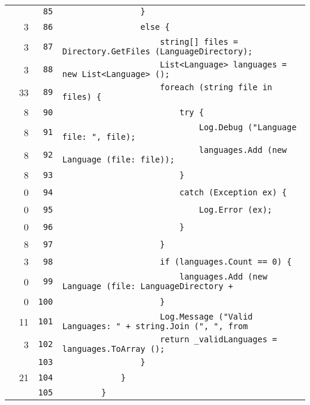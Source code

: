 \documentclass[a4paper,10pt]{article}
\begin{document}
\begin{longtable}[l]{lrrl}
\cellcolor{gray} &  & \verb~85~ & \verb~                }~\\
\cellcolor{green} & 3 & \verb~86~ & \verb~                else {~\\
\cellcolor{green} & 3 & \verb~87~ & \verb~                    string[] files = Directory.GetFiles (LanguageDirectory);~\\
\cellcolor{green} & 3 & \verb~88~ & \verb~                    List<Language> languages = new List<Language> ();~\\
\cellcolor{green} & 33 & \verb~89~ & \verb~                    foreach (string file in files) {~\\
\cellcolor{green} & 8 & \verb~90~ & \verb~                        try {~\\
\cellcolor{green} & 8 & \verb~91~ & \verb~                            Log.Debug ("Language file: ", file);~\\
\cellcolor{green} & 8 & \verb~92~ & \verb~                            languages.Add (new Language (file: file));~\\
\cellcolor{green} & 8 & \verb~93~ & \verb~                        }~\\
\cellcolor{red} & 0 & \verb~94~ & \verb~                        catch (Exception ex) {~\\
\cellcolor{red} & 0 & \verb~95~ & \verb~                            Log.Error (ex);~\\
\cellcolor{red} & 0 & \verb~96~ & \verb~                        }~\\
\cellcolor{green} & 8 & \verb~97~ & \verb~                    }~\\
\cellcolor{green} & 3 & \verb~98~ & \verb~                    if (languages.Count == 0) {~\\
\cellcolor{red} & 0 & \verb~99~ & \verb~                        languages.Add (new Language (file: LanguageDirectory +~\\
\cellcolor{red} & 0 & \verb~100~ & \verb~                    }~\\
\cellcolor{green} & 11 & \verb~101~ & \verb~                    Log.Message ("Valid Languages: " + string.Join (", ", from~\\
\cellcolor{green} & 3 & \verb~102~ & \verb~                    return _validLanguages = languages.ToArray ();~\\
\cellcolor{gray} &  & \verb~103~ & \verb~                }~\\
\cellcolor{green} & 21 & \verb~104~ & \verb~            }~\\
\cellcolor{gray} &  & \verb~105~ & \verb~        }~\\

\end{longtable}
\end{document}
